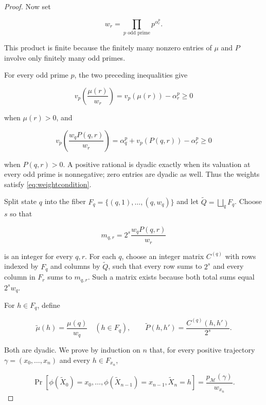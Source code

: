 \documentclass[10pt]{article}
\theoremstyle{definition}
\begin{document}
\begin{proof}
Now set

\begin{equation}
 w_r
 =
 \prod_{p\text{ odd prime}}p^{\alpha_r^p}.
\end{equation}

This product is finite because the finitely many nonzero entries of $\mu$ and
$P$ involve only finitely many odd primes.

For every odd prime $p$, the two preceding inequalities give

\begin{equation}
 v_p\!\left(\frac{\mu(r)}{w_r}\right)
 =
 v_p(\mu(r))-\alpha_r^p
 \ge0
\end{equation}

when $\mu(r)>0$, and

\begin{equation}
 v_p\!\left(\frac{w_qP(q,r)}{w_r}\right)
 =
 \alpha_q^p+v_p(P(q,r))-\alpha_r^p
 \ge0
\end{equation}

when $P(q,r)>0$.  A positive rational is dyadic exactly when its valuation at
every odd prime is nonnegative; zero entries are dyadic as well.  Thus the
weights satisfy \cref{eq:weightcondition}.

Split state $q$ into the fiber
$F_q=\{(q,1),\ldots,(q,w_q)\}$ and let
$\widetilde Q=\bigsqcup_qF_q$.  Choose $s$ so that

\begin{equation}
 m_{q,r}
 =
 2^s\frac{w_qP(q,r)}{w_r}
\end{equation}

is an integer for every $q,r$.  For each $q$, choose an integer matrix
$C^{(q)}$ with rows indexed by $F_q$ and columns by $\widetilde Q$, such that
every row sums to $2^s$ and every column in $F_r$ sums to $m_{q,r}$.  Such a
matrix exists because both total sums equal $2^sw_q$.

For $h\in F_q$, define

\begin{equation}
 \widetilde\mu(h)=\frac{\mu(q)}{w_q}\quad(h\in F_q),
 \qquad
 \widetilde P(h,h')=\frac{C^{(q)}(h,h')}{2^s}.
 \label{eq:lift}
\end{equation}

Both are dyadic.  We prove by induction on $n$ that, for every positive
trajectory $\gamma=(x_0,\ldots,x_n)$ and every $h\in F_{x_n}$,

\begin{equation}
 \Pr[\phi(\widetilde X_0)=x_0,\ldots,
      \phi(\widetilde X_{n-1})=x_{n-1},\widetilde X_n=h]
 =\frac{p_{\mathcal M}(\gamma)}{w_{x_n}}.
\end{equation}


\end{proof}
\end{document}

